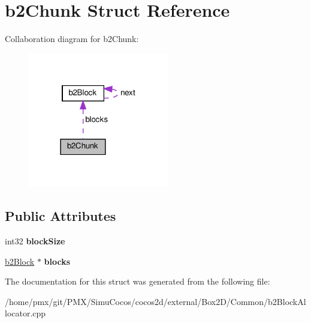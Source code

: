 \hypertarget{structb2Chunk}{}\section{b2\+Chunk Struct Reference}
\label{structb2Chunk}


Collaboration diagram for b2\+Chunk\+:
\nopagebreak
\begin{figure}[H]
\begin{center}
\leavevmode
\includegraphics[width=174pt]{structb2Chunk__coll__graph}
\end{center}
\end{figure}
\subsection*{Public Attributes}
\begin{DoxyCompactItemize}
\item 
\mbox{\label{structb2Chunk_a731df6d026298426622990c251cf742a}} 
int32 {\bfseries block\+Size}
\item 
\mbox{\label{structb2Chunk_aa45617a36287b3dea2130c426cfd42d2}} 
\hyperlink{structb2Block}{b2\+Block} $\ast$ {\bfseries blocks}
\end{DoxyCompactItemize}


The documentation for this struct was generated from the following file\+:\begin{DoxyCompactItemize}
\item 
/home/pmx/git/\+P\+M\+X/\+Simu\+Cocos/cocos2d/external/\+Box2\+D/\+Common/b2\+Block\+Allocator.\+cpp\end{DoxyCompactItemize}

